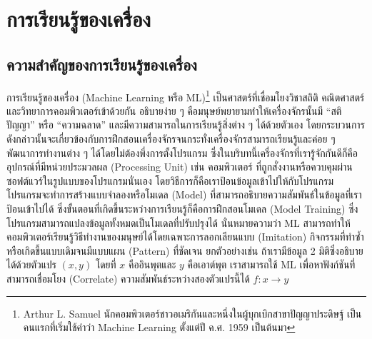 

\chapter{การเรียนรู้ของเครื่อง}
\label{ch:ml}


\section{ความสำคัญของการเรียนรู้ของเครื่อง}
\label{sec:why_ml}

การเรียนรู้ของเครื่อง (Machine Learning หรือ ML)\footnote{Arthur L. Samuel นักคอมพิวเตอร์ชาวอเมริกันและหนึ่งในผู้บุกเบิกสาขาปัญญาประดิษฐ์ เป็นคนแรกที่เริ่มใช้คำว่า Machine Learning ตั้งแต่ปี ค.ศ. 1959 เป็นต้นมา\autocite{samuel1959}} เป็นศาสตร์ที่เชื่อมโยงวิชาสถิติ คณิตศาสตร์ และวิทยาการคอมพิวเตอร์เข้าด้วยกัน อธิบายง่าย ๆ คือมนุษย์พยายามทำให้เครื่องจักรนั้นมี \enquote{สติปัญญา} หรือ \enquote{ความฉลาด} และมีความสามารถในการเรียนรู้สิ่งต่าง ๆ ได้ด้วยตัวเอง โดยกระบวนการดังกล่าวนั้นจะเกี่ยวข้องกับการฝึกสอนเครื่องจักรจนกระทั่งเครื่องจักรสามารถเรียนรู้และค่อย ๆ พัฒนาการทำงานต่าง ๆ ได้โดยไม่ต้องพึ่งการตั้งโปรแกรม ซึ่งในบริบทนี้เครื่องจักรที่เรารู้จักกันดีก็คืออุปกรณ์ที่มีหน่วยประมวลผล (Processing Unit) เช่น คอมพิวเตอร์ ที่ถูกสั่งงานหรือควบคุมผ่านซอฟต์แวร์ในรูปแบบของโปรแกรมนั่นเอง โดยวิธีการก็คือเราป้อนข้อมูลเข้าไปให้กับโปรแกรม โปรแกรมจะทำการสร้างแบบจำลองหรือโมเดล (Model) ที่สามารถอธิบายความสัมพันธ์ในข้อมูลที่เราป้อนเข้าไปได้ ซึ่งขั้นตอนที่เกิดขึ้นระหว่างการเรียนรู้ก็คือการฝึกสอนโมเดล (Model Training) ซึ่งโปรแกรมสามารถแปลงข้อมูลทั้งหมดเป็นโมเดลที่ปรับปรุงได้ นั่นหมายความว่า ML สามารถทำให้คอมพิวเตอร์เรียนรู้วิธีทำงานของมนุษย์ได้โดยเฉพาะการลอกเลียนแบบ (Imitation) กิจกรรมที่ทำซ้ำหรือเกิดขึ้นแบบเดิมจนมีแบบแผน (Pattern) ที่ชัดเจน ยกตัวอย่างเช่น ถ้าเรามีข้อมูล 2 มิติซึ่งอธิบายได้ด้วยตัวแปร $(x,y)$ โดยที่ $x$ คืออินพุตและ $y$ คือเอาต์พุต เราสามารถใช้ ML เพื่อหาฟังก์ชันที่สามารถเชื่อมโยง (Correlate) ความสัมพันธ์ระหว่างสองตัวแปรนี้ได้ $f: x\rightarrow y$

